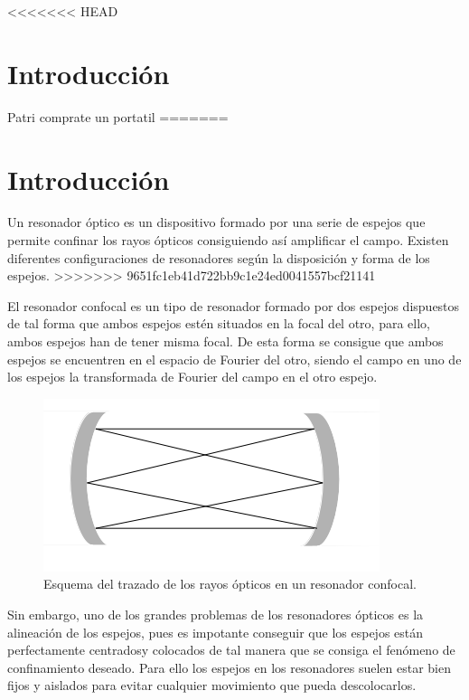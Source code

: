 \documentclass[twoside]{article}
\begin{document}
		\begin{multicols}{2} %

<<<<<<< HEAD
		\section{Introducción} %
							 
			Patri comprate un portatil
=======
			\section{Introducción} %
								 
				Un resonador óptico es un dispositivo formado por una serie de espejos que permite confinar los rayos ópticos consiguiendo así amplificar el campo. Existen diferentes configuraciones de resonadores según la disposición y forma de los espejos.
>>>>>>> 9651fc1eb41d722bb9c1e24ed0041557bcf21141

				El resonador confocal es un tipo de resonador formado por dos espejos dispuestos de tal forma que ambos espejos estén situados en la focal del otro, para ello, ambos espejos han de tener misma focal. De esta forma se consigue que ambos espejos se encuentren en el espacio de Fourier del otro, siendo el campo en uno de los espejos la transformada de Fourier del campo en el otro espejo.

				\begin{figure}[H]
					\centering
					\includegraphics[scale=0.5]{ResonadorConfocal.png}
					\caption{\label{Img:Resonador}Esquema del trazado de los rayos ópticos en un resonador confocal.}
				\end{figure}

				Sin embargo, uno de los grandes problemas de los resonadores ópticos es la alineación de los espejos, pues es impotante conseguir que los espejos están perfectamente centradosy colocados de tal manera que se consiga el fenómeno de confinamiento deseado. Para ello los espejos en los resonadores suelen estar bien fijos y aislados para evitar cualquier movimiento que pueda descolocarlos.


\end{multicols}
\end{document}
